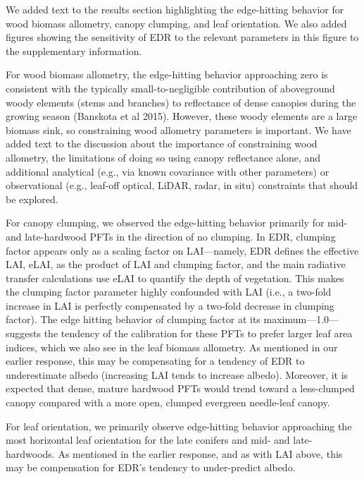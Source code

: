 
We added text to the results section highlighting the edge-hitting behavior for wood biomass allometry, canopy clumping, and leaf orientation. We also added figures showing the sensitivity of EDR to the relevant parameters in this figure to the supplementary information.

For wood biomass allometry, the edge-hitting behavior approaching zero is consistent with the typically small-to-negligible contribution of aboveground woody elements (stems and branches) to reflectance of dense canopies during the growing season (Banskota et al 2015). However, these woody elements are a large biomass sink, so constraining wood allometry parameters is important. We have added text to the discussion about the importance of constraining wood allometry, the limitations of doing so using canopy reflectance alone, and additional analytical (e.g., via known covariance with other parameters) or observational (e.g., leaf-off optical, LiDAR, radar, in situ) constraints that should be explored.

For canopy clumping, we observed the edge-hitting behavior primarily for mid- and late-hardwood PFTs in the direction of no clumping. In EDR, clumping factor appears only as a scaling factor on LAI---namely, EDR defines the effective LAI, eLAI, as the product of LAI and clumping factor, and the main radiative transfer calculations use eLAI to quantify the depth of vegetation. This makes the clumping factor parameter highly confounded with LAI (i.e., a two-fold increase in LAI is perfectly compensated by a two-fold decrease in clumping factor). The edge hitting behavior of clumping factor at its maximum---1.0---suggests the tendency of the calibration for these PFTs to prefer larger leaf area indices, which we also see in the leaf biomass allometry. As mentioned in our earlier response, this may be compensating for a tendency of EDR to underestimate albedo (increasing LAI tends to increase albedo). Moreover, it is expected that dense, mature hardwood PFTs would trend toward a less-clumped canopy compared with a more open, clumped evergreen needle-leaf canopy.

For leaf orientation, we primarily observe edge-hitting behavior approaching the most horizontal leaf orientation for the late conifers and mid- and late-hardwoods. As mentioned in the earlier response, and as with LAI above, this may be compensation for EDR’s tendency to under-predict albedo.


